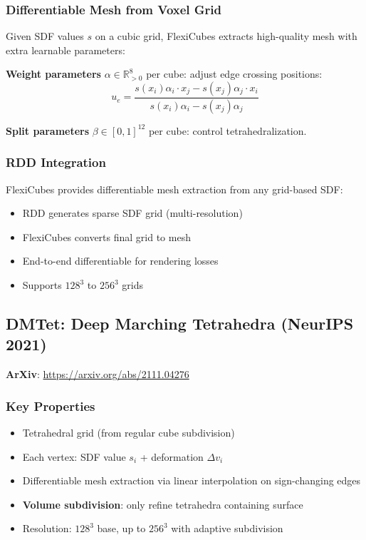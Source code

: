 \documentclass[11pt, a4paper]{article}
\begin{document}
\subsubsection{Differentiable Mesh from Voxel Grid}

Given SDF values $s$ on a cubic grid, FlexiCubes extracts high-quality mesh with extra learnable parameters:

\textbf{Weight parameters} $\alpha \in \mathbb{R}_{>0}^8$ per cube: adjust edge crossing positions:
\begin{equation}
    u_e = \frac{s(x_i)\alpha_i \cdot x_j - s(x_j)\alpha_j \cdot x_i}{s(x_i)\alpha_i - s(x_j)\alpha_j}
\end{equation}

\textbf{Split parameters} $\beta \in [0,1]^{12}$ per cube: control tetrahedralization.

\subsubsection{RDD Integration}

FlexiCubes provides differentiable mesh extraction from any grid-based SDF:
\begin{itemize}
    \item RDD generates sparse SDF grid (multi-resolution)
    \item FlexiCubes converts final grid to mesh
    \item End-to-end differentiable for rendering losses
    \item Supports $128^3$ to $256^3$ grids
\end{itemize}

\subsection{DMTet: Deep Marching Tetrahedra (NeurIPS 2021)}

\textbf{ArXiv}: \url{https://arxiv.org/abs/2111.04276}

\subsubsection{Key Properties}

\begin{itemize}
    \item Tetrahedral grid (from regular cube subdivision)
    \item Each vertex: SDF value $s_i$ + deformation $\Delta v_i$
    \item Differentiable mesh extraction via linear interpolation on sign-changing edges
    \item \textbf{Volume subdivision}: only refine tetrahedra containing surface
    \item Resolution: $128^3$ base, up to $256^3$ with adaptive subdivision
\end{itemize}
\end{document}

